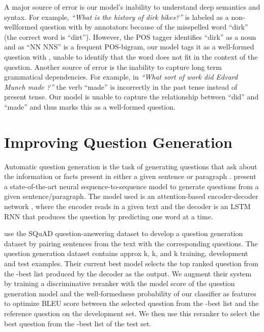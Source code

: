 \documentclass[11pt,a4paper]{article}
\newcommand{\ignore}[1]{}
\begin{document}
A major source of error is our model's inability to understand deep semantics and syntax.
For example, \textit{``What is the history of dirk bikes?''} is labeled as a non-wellformed
question with  by annotators because of the misspelled word ``dirk'' (the correct 
word is ``dirt''). However, the POS tagger identifies ``dirk'' as a noun and as ``NN NNS'' 
is a frequent POS-bigram, our model tags it as a well-formed question with ,
unable to identify that the word does not fit in the context of the question.
Another source of error is the inability to capture long term grammatical dependencies. For
example, in \textit{``What sort of work did Edvard Munch made ?''} the verb ``made'' is
incorrectly in the past tense instead of present tense. Our model is unable to capture
the relationship between ``did'' and ``made'' and thus marks this as a well-formed
question.

\section{Improving Question Generation}
\label{sec:extrinsic}

Automatic question generation is the task of generating questions that ask about the
information or facts present in either a given sentence or paragraph
\cite{Vanderwende:2008,Heilman:2010}.  present a state-of-the-art
neural sequence-to-sequence model to generate questions from a given sentence/paragraph.
The model used is an attention-based encoder-decoder network \cite{attention},
where the encoder reads in  a given text and the decoder is an LSTM RNN that
produces the  question by predicting one word at a time. \ignore{conditioned on the current
hidden layer and the attention-weighted hidden layers of the encoder.}

 use the SQuAD question-answering dataset \cite{squad} to
develop a question generation dataset by pairing sentences from the text with the
corresponding questions. 
The question generation dataset contains approx k, k, and k training, development and test examples.
Their current best model selects the
top ranked question from the -best list produced by the decoder as the output.
We augment their system by training a discriminative reranker
\cite{collins:2005} with the model score of the question generation model and the
well-formedness probability of our classifier as features to optimize BLEU score
\cite{bleu} between the selected question from the -best list and the reference
question on the development set. We then use this reranker to select the best question
from the -best list of the test set.
\end{document}
